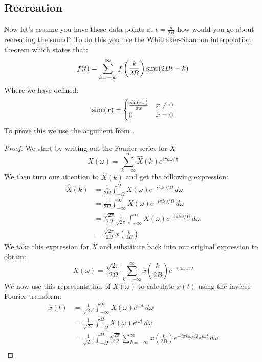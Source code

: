 \documentclass [../article.tex]{subfiles}
\begin{document}
  \subsection{Recreation}
  Now let's assume you have these data points at $t=\frac{n}{2B}$
  how would you go about recreating the sound? To do this you use
  the Whittaker-Shannon interpolation theorem which states that:
  \[f(t) = \sum_{k=-\infty}^\infty f\left(\frac{k}{2B}\right)\operatorname{sinc}(2Bt-k)\]
  Where we have defined:
  \[\operatorname{sinc}(x) = \begin{cases}
                  \frac{\sin(\pi x)}{\pi x} & x \neq 0\\
                  0 & x = 0
                \end{cases} \]
  To prove this we use the argument from \cite{vrscay_2008}.
  \begin{proof}
    We start by writing out the Fourier series for $X$
    \[X(\omega)=\sum_{k=\infty}^\infty\hat{X}(k)e^{i\pi k\omega/\pi}\]
    We then turn our attention to $\hat{X}(k)$ and get the following
    expression:
    \begin{align*}
      \hat{X}(k) &= \frac{1}{2\Omega}\int_{-\Omega}^\Omega X(\omega)
      e^{-i\pi k \omega/\Omega}\,d\omega\\
      {} &= \frac{1}{2\Omega}\int_{-\infty}^\infty X(\omega)
      e^{-i\pi k \omega/\Omega}\,d\omega\\
      {} &= \frac{\sqrt{2\pi}}{2\Omega}\frac{1}{\sqrt{2\pi}}
      \int_{-\infty}^\infty X(\omega) e^{-i\pi k \omega/\Omega}\,d\omega\\
      {} &= \frac{\sqrt{2\pi}}{2\Omega}x\left(\frac{k}{2B}\right)
    \end{align*}
    We take this expression for $\hat{X}$ and substitute back
    into our original expression to obtain:
    \[ X(\omega) = \frac{\sqrt{2\pi}}{2\Omega}\sum_{k=-\infty}^\infty
    x\left(\frac{k}{2B}\right)e^{-i\pi k\omega/\Omega}\]
    We now use this representation of $X(\omega)$ to calculate
    $x(t)$ using the inverse Fourier transform:
    \begin{align*}
      x(t) &= \frac{1}{\sqrt{2\pi}}\int_{-\infty}^\infty X(\omega) e^{i\omega t}\,d\omega\\
      {} &= \frac{1}{\sqrt{2\pi}}\int_{-\Omega}^\Omega X(\omega) e^{i\omega t}\,d\omega\\
      {} &= \frac{1}{\sqrt{2\pi}}\int_{-\Omega}^\Omega \frac{\sqrt{2\pi}}{2\Omega}\sum_{k=-\infty}^\infty
      x\left(\frac{k}{2B}\right)e^{-i\pi k\omega/\Omega} e^{i\omega t}\,d\omega\\

\end{align*}
\end{proof}
\end{document}
